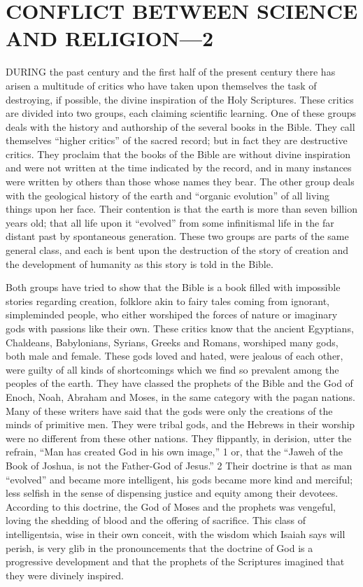 \chapter{CONFLICT BETWEEN SCIENCE AND RELIGION—2}

DURING the past century and the first half of the present century there has arisen a multitude
of critics who have taken upon themselves the task of destroying, if possible, the divine
inspiration of the Holy Scriptures. These critics are divided into two groups, each claiming
scientific learning. One of these groups deals with the history and authorship of the several
books in the Bible. They call themselves ``higher critics'' of the sacred record; but in fact they
are destructive critics. They proclaim that the books of the Bible are without divine
inspiration and were not written at the time indicated by the record, and in many instances
were written by others than those whose names they bear. The other group deals with the
geological history of the earth and ``organic evolution'' of all living things upon her face.
Their contention is that the earth is more than seven billion years old; that all life upon it
``evolved'' from some infinitismal life in the far distant past by spontaneous generation. These
two groups are parts of the same general class, and each is bent upon the destruction of the
story of creation and the development of humanity as this story is told in the Bible.

Both groups have tried to show that the Bible is a book filled with impossible stories
regarding creation, folklore akin to fairy tales coming from ignorant, simpleminded people,
who either worshiped the forces of nature or imaginary gods with passions like their own.
These critics know that the ancient Egyptians, Chaldeans, Babylonians, Syrians, Greeks and
Romans, worshiped many gods, both male and female. These gods loved and hated, were
jealous of each other, were guilty of all kinds of shortcomings which we find so prevalent
among the peoples of the earth. They have classed the prophets of the Bible and the God of
Enoch, Noah, Abraham and Moses, in the same category with the pagan nations. Many of
these writers have said that the gods were only the creations of the minds of primitive men.
They were tribal gods, and the Hebrews in their worship were no different from these other
nations. They flippantly, in derision, utter the refrain, ``Man has created God in his own
image,'' 1 or, that the ``Jaweh of the Book of Joshua, is not the Father-God of Jesus.'' 2 Their
doctrine is that as man ``evolved'' and became more intelligent, his gods became more kind
and merciful; less selfish in the sense of dispensing justice and equity among their devotees.
According to this doctrine, the God of Moses and the prophets was vengeful, loving the
shedding of blood and the offering of sacrifice. This class of intelligentsia, wise in their own
conceit, with the wisdom which Isaiah says will perish, is very glib in the pronouncements
that the doctrine of God is a progressive development and that the prophets of the Scriptures
imagined that they were divinely inspired.

